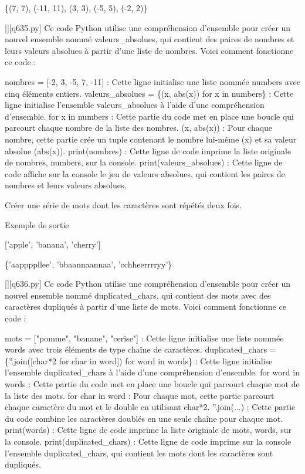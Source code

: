 \{(7, 7), (-11, 11), (3, 3), (-5, 5), (-2, 2)\}
        \par
        \begin{solution}
            \renewcommand{\nomfichier}{q635.py}
            \pythonfile{\chemincode \nomfichier}[][\nomfichier]
            Ce code Python utilise une compréhension d'ensemble pour créer un nouvel ensemble nommé valeurs\_absolues, qui contient des paires de nombres et leurs valeurs absolues à partir d'une liste de nombres. Voici comment fonctionne ce code :

    nombres = [-2, 3, -5, 7, -11] : Cette ligne initialise une liste nommée numbers avec cinq éléments entiers.
    valeurs\_absolues = \{(x, abs(x)) for x in numbers\} : Cette ligne initialise l'ensemble valeurs\_absolues à l'aide d'une compréhension d'ensemble.
        for x in numbers : Cette partie du code met en place une boucle qui parcourt chaque nombre de la liste des nombres.
        (x, abs(x)) : Pour chaque nombre, cette partie crée un tuple contenant le nombre lui-même (x) et sa valeur absolue (abs(x)).
    print(nombres) : Cette ligne de code imprime la liste originale de nombres, numbers, sur la console.
    print(valeurs\_absolues) : Cette ligne de code affiche sur la console le jeu de valeurs absolues, qui contient les paires de nombres et leurs valeurs absolues.
        \end{solution}
        

        \question
        Créer une série de mots dont les caractères sont répétés deux fois.

Exemple de sortie

['apple', 'banana', 'cherry']

\{'aappppllee', 'bbaannaannaa', 'cchheerrrryy'\}
        \par
        \begin{solution}
            \renewcommand{\nomfichier}{q636.py}
            \pythonfile{\chemincode \nomfichier}[][\nomfichier]
            Ce code Python utilise une compréhension d'ensemble pour créer un nouvel ensemble nommé duplicated\_chars, qui contient des mots avec des caractères dupliqués à partir d'une liste de mots. Voici comment fonctionne ce code :

    mots = ["pomme", "banane", "cerise"] : Cette ligne initialise une liste nommée words avec trois éléments de type chaîne de caractères.
    duplicated\_chars = \{''.join([char*2 for char in word]) for word in words\} : Cette ligne initialise l'ensemble duplicated\_chars à l'aide d'une compréhension d'ensemble.
        for word in words : Cette partie du code met en place une boucle qui parcourt chaque mot de la liste des mots.
        for char in word : Pour chaque mot, cette partie parcourt chaque caractère du mot et le double en utilisant char*2.
        ''.join(...) : Cette partie du code combine les caractères doublés en une seule chaîne pour chaque mot.
    print(words) : Cette ligne de code imprime la liste originale de mots, words, sur la console.
    print(duplicated\_chars) : Cette ligne de code imprime sur la console l'ensemble duplicated\_chars, qui contient les mots dont les caractères sont dupliqués.
        \end{solution}
        

